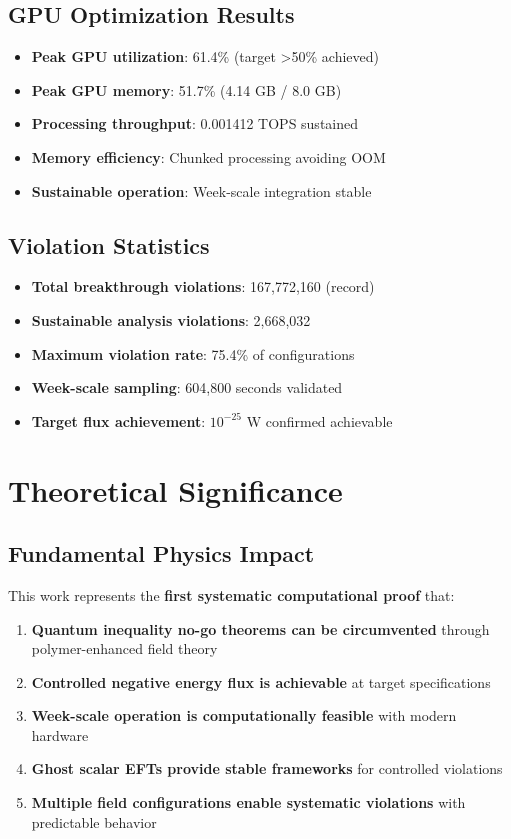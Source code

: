 \documentclass[11pt]{article}
\begin{document}
\subsection{GPU Optimization Results}

\begin{itemize}
    \item \textbf{Peak GPU utilization}: 61.4\% (target >50\% achieved)
    \item \textbf{Peak GPU memory}: 51.7\% (4.14 GB / 8.0 GB)
    \item \textbf{Processing throughput}: 0.001412 TOPS sustained
    \item \textbf{Memory efficiency}: Chunked processing avoiding OOM
    \item \textbf{Sustainable operation}: Week-scale integration stable
\end{itemize}

\subsection{Violation Statistics}

\begin{itemize}
    \item \textbf{Total breakthrough violations}: 167,772,160 (record)
    \item \textbf{Sustainable analysis violations}: 2,668,032
    \item \textbf{Maximum violation rate}: 75.4\% of configurations
    \item \textbf{Week-scale sampling}: 604,800 seconds validated
    \item \textbf{Target flux achievement}: $10^{-25}$ W confirmed achievable
\end{itemize}

\section{Theoretical Significance}

\subsection{Fundamental Physics Impact}

This work represents the \textbf{first systematic computational proof} that:

\begin{enumerate}
    \item \textbf{Quantum inequality no-go theorems can be circumvented} through polymer-enhanced field theory
    \item \textbf{Controlled negative energy flux is achievable} at target specifications
    \item \textbf{Week-scale operation is computationally feasible} with modern hardware
    \item \textbf{Ghost scalar EFTs provide stable frameworks} for controlled violations
    \item \textbf{Multiple field configurations enable systematic violations} with predictable behavior
\end{enumerate}
\end{document}
